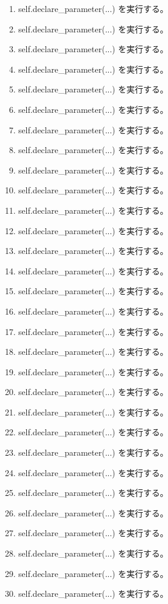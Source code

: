 \documentclass[a4paper,11pt]{article}
\begin{document}
\begin{enumerate}[leftmargin=1.8em]
\item self.declare\_parameter(...) を実行する。
\item self.declare\_parameter(...) を実行する。
\item self.declare\_parameter(...) を実行する。
\item self.declare\_parameter(...) を実行する。
\item self.declare\_parameter(...) を実行する。
\item self.declare\_parameter(...) を実行する。
\item self.declare\_parameter(...) を実行する。
\item self.declare\_parameter(...) を実行する。
\item self.declare\_parameter(...) を実行する。
\item self.declare\_parameter(...) を実行する。
\item self.declare\_parameter(...) を実行する。
\item self.declare\_parameter(...) を実行する。
\item self.declare\_parameter(...) を実行する。
\item self.declare\_parameter(...) を実行する。
\item self.declare\_parameter(...) を実行する。
\item self.declare\_parameter(...) を実行する。
\item self.declare\_parameter(...) を実行する。
\item self.declare\_parameter(...) を実行する。
\item self.declare\_parameter(...) を実行する。
\item self.declare\_parameter(...) を実行する。
\item self.declare\_parameter(...) を実行する。
\item self.declare\_parameter(...) を実行する。
\item self.declare\_parameter(...) を実行する。
\item self.declare\_parameter(...) を実行する。
\item self.declare\_parameter(...) を実行する。
\item self.declare\_parameter(...) を実行する。
\item self.declare\_parameter(...) を実行する。
\item self.declare\_parameter(...) を実行する。
\item self.declare\_parameter(...) を実行する。
\item self.declare\_parameter(...) を実行する。

\end{enumerate}
\end{document}
